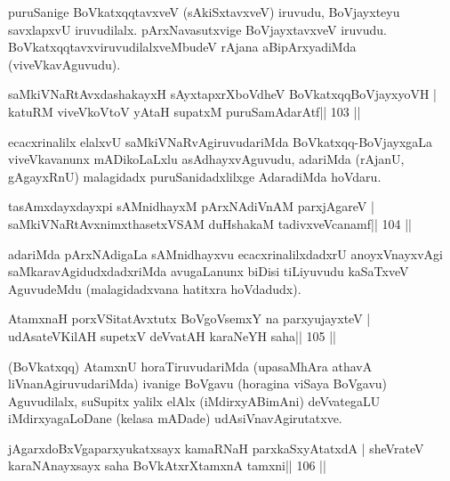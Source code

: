 \begin{artha}
puruSanige BoVkatxqqtavxveV (sAkiSxtavxveV) iruvudu, BoVjayxteyu savxlapxvU iruvu\-dilalx. pArxNavasutxvige BoVjayxtavxveV iruvudu. BoVkatxqqtavxviruvudilalxveMbudeV \-rAjana aBipArxyadiMda (viveVkavAguvudu).
\end{artha}

\begin{shl}
saMkiVNaRtAvxdashakayxH sAyxtapxrXboVdheV BoVkatxqqBoVjayxyoVH |
katuRM viveVkoV\s toV yAtaH supatxM puruSamAdarAtf\hfill || 103 ||
\end{shl}

\begin{artha}
ecacxrinalilx elalxvU saMkiVNaRvAgiruvudariMda BoVkatxqq-BoVjayxgaLa viveVka\-vanunx mADikoLaLxlu asAdhayxvAguvudu, adariMda (rAjanU, gAgayxRnU) malagidadx puruSanidadxlilxge AdaradiMda hoVdaru.
\end{artha}

\begin{shl}
tasAmxdayxdayxpi sAMnidhayxM pArxNAdiVnAM parxjAgareV |
saMkiVNaRtAvxnimxthasetxVSAM duHshakaM tadivxveVcanamf\hfill || 104 ||
\end{shl}

\begin{artha}
adariMda pArxNAdigaLa sAMnidhayxvu ecacxrinalilxdadxrU anoyxVnayxvAgi saMkaravAgi\-dudxdadxriMda avugaLanunx biDisi tiLiyuvudu kaSaTxveV AguvudeMdu (malagidadxvana hatitxra hoVdadudx). 
\end{artha}


\begin{shl}
AtamxnaH porxVSitatAvxtutx BoVgoV\s semxY na parxyujayxteV |
udAsateV\s KilAH supetxV deVvatAH karaNeYH saha\hfill || 105 ||
\end{shl}

\begin{artha}
(BoVkatxqq) AtamxnU horaTiruvudariMda (upasaMhAra athavA liVnanAgiruvu\-dariMda) ivanige BoVgavu (horagina viSaya BoVgavu) Aguvudilalx, suSupitx yalilx elAlx (iMdirxyABimAni) deVvategaLU iMdirxyagaLoDane (kelasa mADade) udAsiVnavAgirutatxve. 
\end{artha}


\begin{shl}
jAgarxdoBxVgaparxyukatxsayx kamaRNaH parxkaSxyAtatxdA |
sheVrateV karaNAnayxsayx saha BoVkAtxrX\s\s tamxnA \s\s tamxni\hfill || 106 ||
\end{shl}

